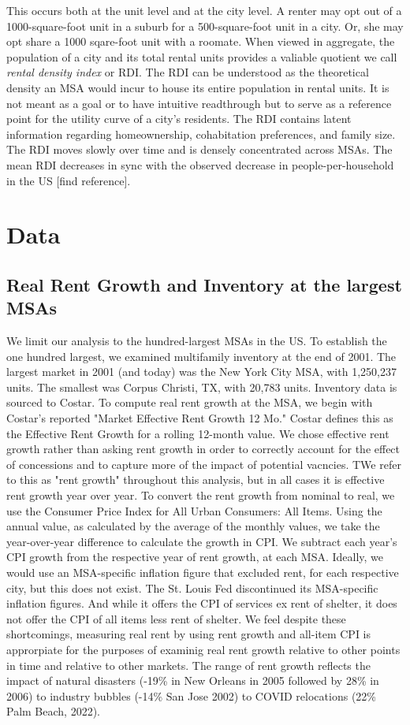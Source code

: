 \documentclass[sn-mathphys-num]{sn-jnl}%
\theoremstyle{thmstyleone}%
\theoremstyle{thmstyletwo}%
\theoremstyle{thmstylethree}%
\begin{document}
This occurs both at the unit level and at the city level. A renter may opt out of a 1000-square-foot unit in a suburb for a 500-square-foot unit in a city. Or, she may opt share a 1000 sqare-foot unit with a roomate. When viewed in aggregate, the population of a city and its total rental units provides a valiable quotient we call \textit{rental density index} or RDI. The RDI can be understood as the theoretical density an MSA would incur to house its entire population in rental units. It is not meant as a goal or to have intuitive readthrough but to serve as a reference point for the utility curve of a city's residents. 
The RDI contains latent information regarding homeownership, cohabitation preferences, and family size. The RDI moves slowly over time and is densely concentrated across MSAs. The mean RDI decreases in sync with the observed decrease in people-per-household in the US [find reference].

\section{Data}
\subsection{Real Rent Growth and Inventory at the largest MSAs}
We limit our analysis to the hundred-largest MSAs in the US. To establish the one hundred largest, we examined multifamily inventory at the end of 2001. The largest market in 2001 (and today) was the New York City MSA, with 1,250,237 units. The smallest was Corpus Christi, TX, with 20,783 units. Inventory data is sourced to Costar. To compute real rent growth at the MSA, we begin with Costar's reported "Market Effective Rent Growth 12 Mo." Costar defines this as the Effective Rent Growth for a rolling 12-month value. We chose effective rent growth rather than asking rent growth in order to correctly account for the effect of concessions and to capture more of the impact of potential vacncies. TWe refer to this as "rent growth" throughout this analysis, but in all cases it is effective rent growth year over year. To convert the rent growth from nominal to real, we use the Consumer Price Index for All Urban Consumers: All Items. Using the annual value, as calculated by the average of the monthly values, we take the year-over-year difference to calculate the growth in CPI. We subtract each year's CPI growth from the respective year of rent growth, at each MSA. Ideally, we would use an MSA-specific inflation figure that excluded rent, for each respective city, but this does not exist. The St. Louis Fed discontinued its MSA-specific inflation figures. And while it offers the CPI of services ex rent of shelter, it does not offer the CPI of all items less rent of shelter. We feel despite these shortcomings, measuring real rent by using rent growth and all-item CPI is approrpiate for the purposes of examinig real rent growth relative to other points in time and relative to other markets. The range of rent growth reflects the impact of natural disasters (-19\% in New Orleans in 2005 followed by 28\% in 2006) to industry bubbles (-14\% San Jose 2002) to COVID relocations (22\% Palm Beach, 2022). 
\end{document}
